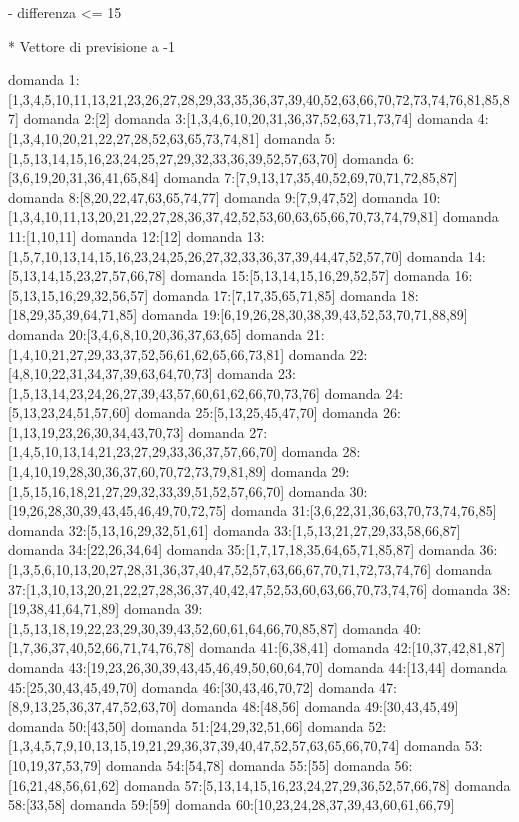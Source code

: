 - differenza <= 15

* Vettore di previsione a -1

domanda 1:[1,3,4,5,10,11,13,21,23,26,27,28,29,33,35,36,37,39,40,52,63,66,70,72,73,74,76,81,85,87]
domanda 2:[2]
domanda 3:[1,3,4,6,10,20,31,36,37,52,63,71,73,74]
domanda 4:[1,3,4,10,20,21,22,27,28,52,63,65,73,74,81]
domanda 5:[1,5,13,14,15,16,23,24,25,27,29,32,33,36,39,52,57,63,70]
domanda 6:[3,6,19,20,31,36,41,65,84]
domanda 7:[7,9,13,17,35,40,52,69,70,71,72,85,87]
domanda 8:[8,20,22,47,63,65,74,77]
domanda 9:[7,9,47,52]
domanda 10:[1,3,4,10,11,13,20,21,22,27,28,36,37,42,52,53,60,63,65,66,70,73,74,79,81]
domanda 11:[1,10,11]
domanda 12:[12]
domanda 13:[1,5,7,10,13,14,15,16,23,24,25,26,27,32,33,36,37,39,44,47,52,57,70]
domanda 14:[5,13,14,15,23,27,57,66,78]
domanda 15:[5,13,14,15,16,29,52,57]
domanda 16:[5,13,15,16,29,32,56,57]
domanda 17:[7,17,35,65,71,85]
domanda 18:[18,29,35,39,64,71,85]
domanda 19:[6,19,26,28,30,38,39,43,52,53,70,71,88,89]
domanda 20:[3,4,6,8,10,20,36,37,63,65]
domanda 21:[1,4,10,21,27,29,33,37,52,56,61,62,65,66,73,81]
domanda 22:[4,8,10,22,31,34,37,39,63,64,70,73]
domanda 23:[1,5,13,14,23,24,26,27,39,43,57,60,61,62,66,70,73,76]
domanda 24:[5,13,23,24,51,57,60]
domanda 25:[5,13,25,45,47,70]
domanda 26:[1,13,19,23,26,30,34,43,70,73]
domanda 27:[1,4,5,10,13,14,21,23,27,29,33,36,37,57,66,70]
domanda 28:[1,4,10,19,28,30,36,37,60,70,72,73,79,81,89]
domanda 29:[1,5,15,16,18,21,27,29,32,33,39,51,52,57,66,70]
domanda 30:[19,26,28,30,39,43,45,46,49,70,72,75]
domanda 31:[3,6,22,31,36,63,70,73,74,76,85]
domanda 32:[5,13,16,29,32,51,61]
domanda 33:[1,5,13,21,27,29,33,58,66,87]
domanda 34:[22,26,34,64]
domanda 35:[1,7,17,18,35,64,65,71,85,87]
domanda 36:[1,3,5,6,10,13,20,27,28,31,36,37,40,47,52,57,63,66,67,70,71,72,73,74,76]
domanda 37:[1,3,10,13,20,21,22,27,28,36,37,40,42,47,52,53,60,63,66,70,73,74,76]
domanda 38:[19,38,41,64,71,89]
domanda 39:[1,5,13,18,19,22,23,29,30,39,43,52,60,61,64,66,70,85,87]
domanda 40:[1,7,36,37,40,52,66,71,74,76,78]
domanda 41:[6,38,41]
domanda 42:[10,37,42,81,87]
domanda 43:[19,23,26,30,39,43,45,46,49,50,60,64,70]
domanda 44:[13,44]
domanda 45:[25,30,43,45,49,70]
domanda 46:[30,43,46,70,72]
domanda 47:[8,9,13,25,36,37,47,52,63,70]
domanda 48:[48,56]
domanda 49:[30,43,45,49]
domanda 50:[43,50]
domanda 51:[24,29,32,51,66]
domanda 52:[1,3,4,5,7,9,10,13,15,19,21,29,36,37,39,40,47,52,57,63,65,66,70,74]
domanda 53:[10,19,37,53,79]
domanda 54:[54,78]
domanda 55:[55]
domanda 56:[16,21,48,56,61,62]
domanda 57:[5,13,14,15,16,23,24,27,29,36,52,57,66,78]
domanda 58:[33,58]
domanda 59:[59]
domanda 60:[10,23,24,28,37,39,43,60,61,66,79]
